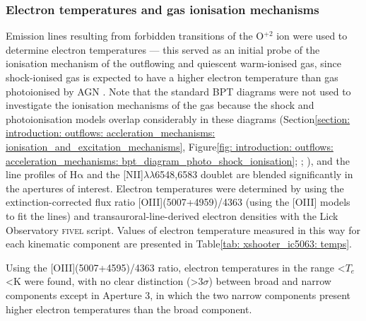 \subsubsection{Electron temperatures and gas ionisation mechanisms}
\label{section: xshooter_ic5063: properties_of_outflowing_gas: uvb_vis_analysis_and_results: electron_temperatures}

Emission lines resulting from forbidden transitions of the O$^{+2}$ ion were used to determine electron temperatures --- this served as an initial probe of the ionisation mechanism of the outflowing and quiescent warm-ionised gas, since shock-ionised gas is expected to have a higher electron temperature than gas photoionised by AGN \citep{Fosbury1978, VillarMartin1999}. Note that the standard BPT diagrams were not used to investigate the ionisation mechanisms of the gas because the shock and photoionisation models overlap considerably in these diagrams (Section\;\ref{section: introduction: outflows: accleration_mechanisms: ionisation_and_excitation_mechanisms}, Figure\;\ref{fig: introduction: outflows: acceleration_mechanisms: bpt_diagram_photo_shock_ionisation}; \citealt{Zaurin2013}; \citealt{Santoro2018}), and the line profiles of H$\mathrm{\alpha}$ and the [NII]$\lambda\lambda$6548,6583 doublet are blended significantly in the apertures of interest. Electron temperatures were determined by using the extinction-corrected flux ratio [OIII](5007+4959)/4363 (using the [OIII] models to fit the lines) and transauroral-line-derived electron densities with the Lick Observatory \textsc{fivel} script. Values of electron temperature measured in this way for each kinematic component are presented in Table\;\ref{tab: xshooter_ic5063: temps}.

Using the [OIII](5007+4595)/4363 ratio, electron temperatures in the range \;\textless\;$T_e$\;\textless{}\;K were found, with no clear distinction (\textgreater\;$3\sigma$) between broad and narrow components except in Aperture 3, in which the two narrow components present higher electron temperatures than the broad component.

